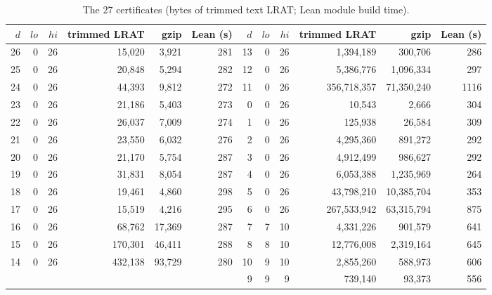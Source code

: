 \documentclass[11pt]{amsart}
\theoremstyle{definition}
\begin{document}
\begin{table}[h]
\centering
\caption{The 27 certificates (bytes of trimmed text LRAT; Lean module
build time).}
\footnotesize
\begin{tabular}{rrrrrr@{\hspace{3em}}rrrrrr}
\toprule
$d$ & $lo$ & $hi$ & trimmed LRAT & gzip & Lean (s) &
$d$ & $lo$ & $hi$ & trimmed LRAT & gzip & Lean (s) \\
\midrule
26 & 0 & 26 &     15{,}020 &     3{,}921 & 281 & 13 & 0 & 26 &   1{,}394{,}189 &    300{,}706 & 286 \\
25 & 0 & 26 &     20{,}848 &     5{,}294 & 282 & 12 & 0 & 26 &   5{,}386{,}776 &  1{,}096{,}334 & 297 \\
24 & 0 & 26 &     44{,}393 &     9{,}812 & 272 & 11 & 0 & 26 & 356{,}718{,}357 & 71{,}350{,}240 & 1116 \\
23 & 0 & 26 &     21{,}186 &     5{,}403 & 273 &  0 & 0 & 26 &      10{,}543 &      2{,}666 & 304 \\
22 & 0 & 26 &     26{,}037 &     7{,}009 & 274 &  1 & 0 & 26 &     125{,}938 &     26{,}584 & 309 \\
21 & 0 & 26 &     23{,}550 &     6{,}032 & 276 &  2 & 0 & 26 &   4{,}295{,}360 &    891{,}272 & 292 \\
20 & 0 & 26 &     21{,}170 &     5{,}754 & 287 &  3 & 0 & 26 &   4{,}912{,}499 &    986{,}627 & 292 \\
19 & 0 & 26 &     31{,}831 &     8{,}054 & 287 &  4 & 0 & 26 &   6{,}053{,}388 &  1{,}235{,}969 & 264 \\
18 & 0 & 26 &     19{,}461 &     4{,}860 & 298 &  5 & 0 & 26 &  43{,}798{,}210 & 10{,}385{,}704 & 353 \\
17 & 0 & 26 &     15{,}519 &     4{,}216 & 295 &  6 & 0 & 26 & 267{,}533{,}942 & 63{,}315{,}794 & 875 \\
16 & 0 & 26 &     68{,}762 &    17{,}369 & 287 &  7 & 7 & 10 &   4{,}331{,}226 &    901{,}579 & 641 \\
15 & 0 & 26 &    170{,}301 &    46{,}411 & 288 &  8 & 8 & 10 &  12{,}776{,}008 &  2{,}319{,}164 & 645 \\
14 & 0 & 26 &    432{,}138 &    93{,}729 & 280 & 10 & 9 & 10 &   2{,}855{,}260 &    588{,}973 & 606 \\
   &    &    &              &            &     &  9 & 9 &  9 &      739{,}140 &     93{,}373 & 556 \\
\bottomrule
\end{tabular}
\end{table}
\end{document}

